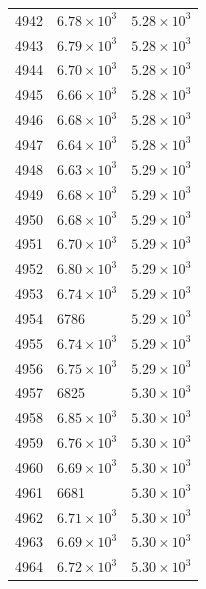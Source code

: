 \begin{table}[H]
\begin{tabular}{lll}
4942 & $\displaystyle 6.78 \times 10^{3}$ & $\displaystyle 5.28 \times 10^{3}$ \\
4943 & $\displaystyle 6.79 \times 10^{3}$ & $\displaystyle 5.28 \times 10^{3}$ \\
4944 & $\displaystyle 6.70 \times 10^{3}$ & $\displaystyle 5.28 \times 10^{3}$ \\
4945 & $\displaystyle 6.66 \times 10^{3}$ & $\displaystyle 5.28 \times 10^{3}$ \\
4946 & $\displaystyle 6.68 \times 10^{3}$ & $\displaystyle 5.28 \times 10^{3}$ \\
4947 & $\displaystyle 6.64 \times 10^{3}$ & $\displaystyle 5.28 \times 10^{3}$ \\
4948 & $\displaystyle 6.63 \times 10^{3}$ & $\displaystyle 5.29 \times 10^{3}$ \\
4949 & $\displaystyle 6.68 \times 10^{3}$ & $\displaystyle 5.29 \times 10^{3}$ \\
4950 & $\displaystyle 6.68 \times 10^{3}$ & $\displaystyle 5.29 \times 10^{3}$ \\
4951 & $\displaystyle 6.70 \times 10^{3}$ & $\displaystyle 5.29 \times 10^{3}$ \\
4952 & $\displaystyle 6.80 \times 10^{3}$ & $\displaystyle 5.29 \times 10^{3}$ \\
4953 & $\displaystyle 6.74 \times 10^{3}$ & $\displaystyle 5.29 \times 10^{3}$ \\
4954 & 6786 & $\displaystyle 5.29 \times 10^{3}$ \\
4955 & $\displaystyle 6.74 \times 10^{3}$ & $\displaystyle 5.29 \times 10^{3}$ \\
4956 & $\displaystyle 6.75 \times 10^{3}$ & $\displaystyle 5.29 \times 10^{3}$ \\
4957 & 6825 & $\displaystyle 5.30 \times 10^{3}$ \\
4958 & $\displaystyle 6.85 \times 10^{3}$ & $\displaystyle 5.30 \times 10^{3}$ \\
4959 & $\displaystyle 6.76 \times 10^{3}$ & $\displaystyle 5.30 \times 10^{3}$ \\
4960 & $\displaystyle 6.69 \times 10^{3}$ & $\displaystyle 5.30 \times 10^{3}$ \\
4961 & 6681 & $\displaystyle 5.30 \times 10^{3}$ \\
4962 & $\displaystyle 6.71 \times 10^{3}$ & $\displaystyle 5.30 \times 10^{3}$ \\
4963 & $\displaystyle 6.69 \times 10^{3}$ & $\displaystyle 5.30 \times 10^{3}$ \\
4964 & $\displaystyle 6.72 \times 10^{3}$ & $\displaystyle 5.30 \times 10^{3}$ \\

\end{tabular}
\end{table}
